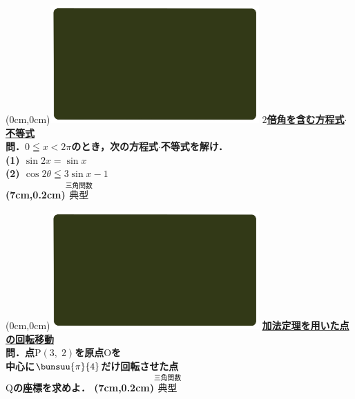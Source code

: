 \documentclass[10pt,
fleqn,
dvipdfmx,
uplatex
]{jsarticle}
\begin{document}
\at(0cm,0cm){\includegraphics[width=8cm,bb=0 0 1920 1080]{./youtube/thumbnails/templates/smart_background/三角関数.jpeg}}
{\color{orange}\bf\boldmath\Large\underline{$2$倍角を含む方程式$\cdot$不等式}}\vspace{0.3zw}\\
\Large 
\bf\boldmath 問．$0\leqq x<2\pi$のとき，次の方程式$\cdot$不等式を解け．\\
(1)  $\sin 2x=\sin x$\\
(2)  $\cos 2\theta \leqq 3\sin x-1$\\

\at(7cm,0.2cm){\small\color{bradorange}$\overset{\text{三角関数}}{\text{典型}}$}

\newpage

\at(0cm,0cm){\includegraphics[width=8cm,bb=0 0 1920 1080]{./youtube/thumbnails/templates/smart_background/三角関数.jpeg}}
{\color{orange}\bf\boldmath\Large\underline{加法定理を用いた点の回転移動}}\vspace{0.3zw}\\
\LARGE 
\bf\boldmath 問．点$\text{P}\left(3,\;2\right)$を原点$\text{O}$を\vspace{0.5zw}\\中心に$\bunsuu{\pi }{4}$だけ回転させた点\vspace{0.2zw}\\$\text{Q}$の座標を求めよ．
\at(7cm,0.2cm){\small\color{bradorange}$\overset{\text{三角関数}}{\text{典型}}$}

\newpage
\end{document}
